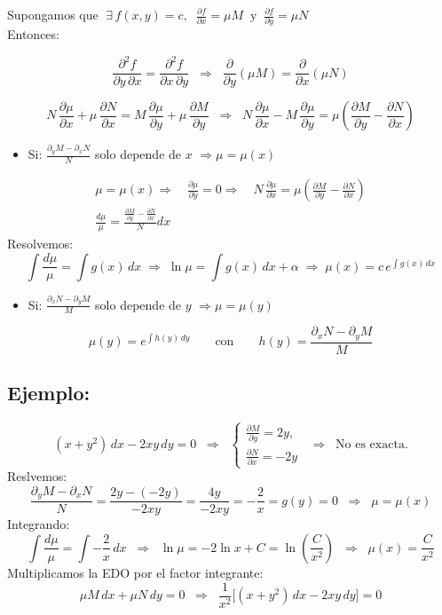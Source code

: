 \documentclass[a4paper,12pt]{article}
\begin{document}
\medskip
\noindent
Supongamos que $\;\exists\,f(x,y)=c,\;\; \frac{\partial f}{\partial x}=\mu M\;\; \text{y}\;\; \frac{\partial f}{\partial y}=\mu N$\\
Entonces:

\[
\frac{\partial^2 f}{\partial y\,\partial x}=\frac{\partial^2 f}{\partial x\,\partial y}
\;\;\Rightarrow\;\;
\frac{\partial}{\partial y}(\mu M)=\frac{\partial}{\partial x}(\mu N)
\]

\[
N\,\frac{\partial \mu}{\partial x}+\mu\,\frac{\partial N}{\partial x}
=
M\,\frac{\partial \mu}{\partial y}+\mu\,\frac{\partial M}{\partial y}
\;\;\Rightarrow\;\;
N\,\frac{\partial \mu}{\partial x}-M\,\frac{\partial \mu}{\partial y}
=
\mu\!\left(\frac{\partial M}{\partial y}-\frac{\partial N}{\partial x}\right)
\]
\newpage
\begin{itemize}
\item Si: $\displaystyle \frac{\partial_y M-\partial_x N}{N}$ solo depende de $x$ $\Rightarrow \mu=\mu(x)$
\end{itemize}

\[
\begin{gathered}
\mu = \mu(x) \Rightarrow\quad \frac{\partial \mu}{\partial y} = 0 
\Rightarrow\quad N\,\frac{\partial \mu}{\partial x} 
= \mu\!\left(\frac{\partial M}{\partial y} - \frac{\partial N}{\partial x}\right) \\[4pt]
\frac{d\mu}{\mu} =
\frac{\tfrac{\partial M}{\partial y} - \tfrac{\partial N}{\partial x}}{N}dx
\end{gathered}
\]
Resolvemos:
\[
\int \frac{d\mu}{\mu}=\int g(x)\,dx
\;\Rightarrow\;
\ln\mu=\int g(x)\,dx+\alpha
\;\Rightarrow\;
\mu(x)=c\,e^{\int g(x)\,dx}
\]
\medskip
\begin{itemize}
\item Si: $\displaystyle \frac{\partial_x N-\partial_y M}{M}$ solo depende de $y$ $\Rightarrow \mu=\mu(y)$
\end{itemize}

\[
\mu(y)=e^{\int h(y)\,dy}
\qquad\text{con}\qquad
h(y)=\frac{\partial_x N-\partial_y M}{M}
\]

\bigskip
\subsection*{Ejemplo:}
\[
(x+y^2)\,dx - 2xy\,dy = 0
\;\;\Rightarrow\;\;
\begin{cases}
\frac{\partial M}{\partial y} = 2y, \\[6pt]
\frac{\partial N}{\partial x} = -2y
\end{cases}
\;\;\Rightarrow\;\; \text{No es exacta.}
\]
Reslvemos:
\[
\frac{\partial_y M - \partial_x N}{N} = \frac{2y - (-2y)}{-2xy} = \frac{4y}{-2xy} = -\frac{2}{x}
= g(y)=0
\;\;\Rightarrow\;\; \mu=\mu(x)
\]
Integrando:
\[
\int \frac{d\mu}{\mu} = \int -\frac{2}{x}\,dx
\;\;\Rightarrow\;\;
\ln\mu = -2\ln x + C = \ln\left(\frac{C}{x^2}\right)
\;\;\Rightarrow\;\;
\mu(x)=\frac{C}{x^2}
\]
\newpage
\noindent
Multiplicamos la EDO por el factor integrante:
\[
\mu M\,dx + \mu N\,dy = 0
\;\;\Rightarrow\;\;
\frac{1}{x^2}\big[(x+y^2)\,dx - 2xy\,dy\big]=0
\]
\end{document}
